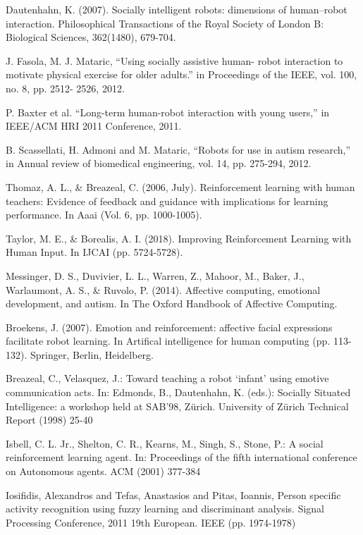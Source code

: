\documentclass[conference]{IEEEtran}
\begin{document}
\begin{thebibliography}{1}
Dautenhahn, K. (2007). Socially intelligent robots: dimensions of human–robot interaction. Philosophical Transactions of the Royal Society of London B: Biological Sciences, 362(1480), 679-704.

J. Fasola, M. J. Mataric, “Using socially assistive human-
robot interaction to motivate physical exercise for older
adults.” in Proceedings of the IEEE, vol. 100, no. 8, pp. 2512-
2526, 2012.

P. Baxter et al. “Long-term human-robot interaction with
young users,” in IEEE/ACM HRI 2011 Conference, 2011.

B. Scassellati, H. Admoni and M. Mataric, “Robots for use in
autism research,” in Annual review of biomedical
engineering, vol. 14, pp. 275-294, 2012.

Thomaz, A. L., \& Breazeal, C. (2006, July). Reinforcement learning with human teachers: Evidence of feedback and guidance with implications for learning performance. In Aaai (Vol. 6, pp. 1000-1005).

Taylor, M. E., \& Borealis, A. I. (2018). Improving Reinforcement Learning with Human Input. In IJCAI (pp. 5724-5728).

Messinger, D. S., Duvivier, L. L., Warren, Z., Mahoor, M., Baker, J., Warlaumont, A. S., \& Ruvolo, P. (2014). Affective computing, emotional development, and autism. In The Oxford Handbook of Affective Computing.

Broekens, J. (2007). Emotion and reinforcement: affective facial expressions facilitate robot learning. In Artifical intelligence for human computing (pp. 113-132). Springer, Berlin, Heidelberg.

Breazeal, C., Velasquez, J.: Toward teaching a robot `infant' using emotive communication acts. In: Edmonds, B., Dautenhahn, K. (eds.): Socially Situated Intelligence: a workshop held at SAB'98, Zürich. University of Zürich Technical Report
(1998) 25-40

Isbell, C. L. Jr., Shelton, C. R., Kearns, M., Singh, S., Stone, P.: A social reinforcement learning agent. In: Proceedings of the fifth international conference on Autonomous
agents. ACM (2001) 377-384

Iosifidis, Alexandros and Tefas, Anastasios and Pitas, Ioannis, Person specific activity recognition using fuzzy learning and discriminant analysis. Signal Processing Conference, 2011 19th European. IEEE (pp. 1974-1978)


\end{thebibliography}
\end{document}
